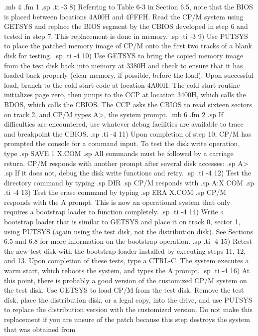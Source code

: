 .mb 4
.fm 1
.sp
.ti -3
8) Referring to Table 6-3 in Section 6.5, note that the BIOS is 
placed between locations 4A00H and 4FFFH.  Read the CP/M system 
using GETSYS and replace the BIOS segment by the CBIOS developed 
in step 6 and tested in step 7.  This replacement is done in 
memory. 
.sp
.ti -3
9) Use PUTSYS to place the patched memory image of CP/M onto the 
first two tracks of a blank disk for testing.
.sp
.ti -4
10) Use GETSYS to bring the copied memory image from the test 
disk back into memory at 3380H and check to ensure that it has 
loaded back properly (clear memory, if possible, before the 
load).  Upon successful load, branch to the cold start code at 
location 4A00H.  The cold start routine initializes page 
zero, then jumps to the CCP at location 3400H, which calls the 
BDOS, which calls the CBIOS.  The CCP asks the CBIOS to read 
sixteen sectors on track 2, and CP/M types A>, the system 
prompt.
.mb 6
.fm 2
.sp
If difficulties are encountered, use whatever debug facilities 
are available to trace and breakpoint the CBIOS.
.sp
.ti -4
11) Upon completion of step 10, CP/M has prompted the console for 
a command input.  To test the disk write operation, type
.sp
SAVE 1 X.COM
.sp
All commands must be followed by a carriage return.  CP/M 
responds with another prompt after several disk accesses:
.sp
A>
.sp
If it does not, debug the disk write functions and retry.
.sp
.ti -4
12) Test the directory command by typing 
.sp
DIR
.sp
CP/M responds with 
.sp
A:X     COM
.sp
.ti -4
13) Test the erase command by typing
.sp
ERA X.COM
.sp
CP/M responds with the A prompt.  This is now an operational 
system that only requires a bootstrap loader to function 
completely.
.sp
.ti -4
14) Write a bootstrap loader that is similar to GETSYS and place 
it on track 0, sector 1, using PUTSYS (again using the test disk, 
not the distribution disk).  See Sections 6.5 and 6.8 for more 
information on the bootstrap operation.
.sp
.ti -4
15) Retest the new test disk with the bootstrap loader installed 
by executing steps 11, 12, and 13.  Upon completion of these 
tests, type a CTRL-C.  The system executes a warm start, which 
reboots the system, and types the A prompt.
.sp
.ti -4
16) At this point, there is probably a good version of the 
customized CP/M system on the test disk.  Use GETSYS to load CP/M 
from the test disk.  Remove the test disk, place the distribution 
disk, or a legal copy, into the drive, and use PUTSYS to 
replace the distribution version with the customized version.  
Do not make this replacement if you are unsure of the patch 
because this step destroys the system that was obtained from 
